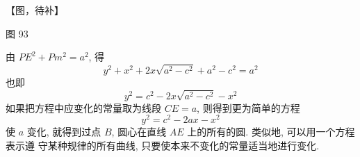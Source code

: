 【图，待补】

图 93

由 $P E^{2}+P m^{2}=a^{2}$, 得
\[
y^{2}+x^{2}+2 x \sqrt{a^{2}-c^{2}}+a^{2}-c^{2}=a^{2}
\]
也即
\[
y^{2}=c^{2}-2 x \sqrt{a^{2}-c^{2}}-x^{2}
\]
如果把方程中应变化的常量取为线段 $C E=a$, 则得到更为简单的方程
\[
y^{2}=c^{2}-2 a x-x^{2}
\]
使 $a$ 变化, 就得到过点 $B$, 圆心在直线 $A E$ 上的所有的圆. 类似地, 可以用一个方程表示遵 守某种规律的所有曲线, 只要使本来不变化的常量适当地进行变化.



